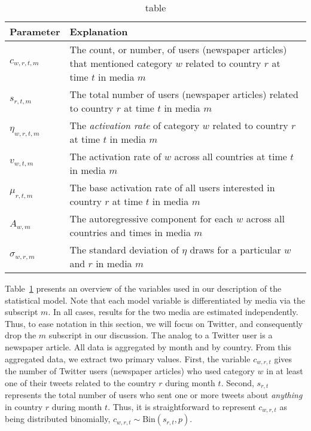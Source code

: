 \begin{table}[t]
	\centering
	\begin{tabularx} {\textwidth}{ |l | X| }
	\hline 
		{\bf Parameter} & {\bf Explanation} \\ \hline 
		$c_{w,r,t,m}$ & The $c$ount, or number, of users (newspaper articles) that mentioned category $w$ related to country $r$ at time $t$ in media $m$ \\ \hline 
		$s_{r,t,m}$ & The total number of users (newspaper articles) related to country $r$ at time $t$ in media $m$  \\ \hline 
		$\eta_{w,r,t,m}$ & The \emph{activation rate} of category $w$ related to country $r$ at time $t $ in media $m$ \\ \hline 
		$v_{w,t,m}$ & The activation rate of $w$ across all countries at time $t$ in media $m$  \\ \hline
		$\mu_{r,t,m}$ & The base activation rate of all users interested in country $r$ at time $t$ in media $m$  \\ \hline
		$A_{w,m}$ & The autoregressive component for each $w$ across all countries and times in media $m$  \\ \hline
		$\sigma_{w,r,m}$ & The standard deviation of $\eta$ draws for a particular $w$ and $r$ in media $m$  \\ \hline
	\end{tabularx}
	\caption{table}
	\label{tab:vars}
\end{table}

Table~\ref{tab:vars} presents an overview of the variables used in our description of the statistical model. Note that each model variable is differentiated by media via the subscript $m$. In all cases, results for the two media are estimated independently. Thus, to ease notation in this section, we will focus on Twitter, and consequently drop the $m$ subscript in our discussion.  The analog to a Twitter user is a newspaper article. All data is aggregated by month and by country.  From this aggregated data, we extract two primary values.  First, the variable $c_{w,r,t}$ gives the number of Twitter users (newspaper articles) who used category $w$ in at least one of their tweets related to the country $r$ during month $t$.  Second, $s_{r,t}$ represents the total number of users who sent one or more tweets about \emph{anything} in country $r$ during month $t$.  Thus, it is straightforward to represent $c_{w,r,t}$ as being distributed binomially, $c_{w,r,t} \sim \text{Bin}(s_{r,t},p)$.

